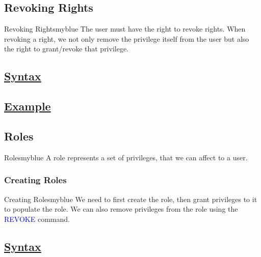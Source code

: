 \vspace{0.25cm}
\subsection{Revoking Rights} 
\begin{prettyBox}{Revoking Rights}{myblue} 
The user must have the right to revoke rights. When revoking a right, we not 
only remove the privilege itself from the user but also the right to
grant/revoke that privilege.
\end{prettyBox}

\vspace{0.15cm}
\subsection*{\underline{Syntax}}


\vspace{0.15cm}
\subsection*{\underline{Example}}


\vspace{0.35cm}
\subsection{Roles} 
\begin{prettyBox}{Roles}{myblue}
A role represents a set of privileges, that we can affect to a user.
\end{prettyBox}

\vspace{0.25cm}

\subsubsection{Creating Roles} 
\begin{prettyBox}{Creating Roles}{myblue}
We need to first create the role, then grant privileges to it to populate
the role. We can also remove privileges from the role using 
the \textcolor{blue}{REVOKE} command.
\end{prettyBox}

\vspace{0.15cm}
\subsection*{\underline{Syntax}}


